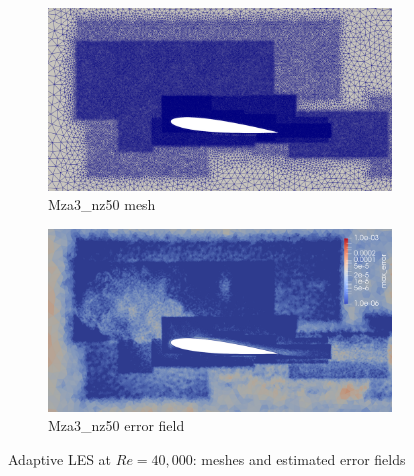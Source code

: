 \begin{figure}[H]
\begin{subfigure}[b]{0.475\textwidth}
	\centering
	\includegraphics[width=1\textwidth]{figures/zonal_adapt_results/Mesh_and_error_plots/Mza3_inplane.png}
	\caption{Mza3\_nz50 mesh}
	\label{fig:zonal_Mza3_mesh}
\end{subfigure}
\begin{subfigure}[b]{0.475\textwidth}
	\centering
	\includegraphics[width=1\textwidth]{figures/zonal_adapt_results/Mesh_and_error_plots/Mza3_error.png}
	\caption{Mza3\_nz50 error field}
	\label{fig:zonal_Mza3_error}
\end{subfigure}
\caption{Adaptive LES at $Re=40,000$: meshes and estimated error fields}
\label{fig:Re40k_meshes}
\end{figure}